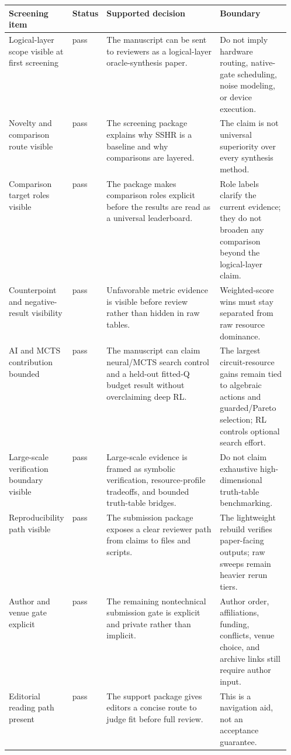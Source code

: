 \begin{tabularx}{\linewidth}{>{\raggedright\arraybackslash}p{0.20\linewidth}>{\raggedright\arraybackslash}p{0.11\linewidth}>{\raggedright\arraybackslash}X>{\raggedright\arraybackslash}p{0.25\linewidth}}
\toprule
Screening item & Status & Supported decision & Boundary \\
\midrule
Logical-layer scope visible at first screening & pass & The manuscript can be sent to reviewers as a logical-layer oracle-synthesis paper. & Do not imply hardware routing, native-gate scheduling, noise modeling, or device execution. \\
Novelty and comparison route visible & pass & The screening package explains why SSHR is a baseline and why comparisons are layered. & The claim is not universal superiority over every synthesis method. \\
Comparison target roles visible & pass & The package makes comparison roles explicit before the results are read as a universal leaderboard. & Role labels clarify the current evidence; they do not broaden any comparison beyond the logical-layer claim. \\
Counterpoint and negative-result visibility & pass & Unfavorable metric evidence is visible before review rather than hidden in raw tables. & Weighted-score wins must stay separated from raw resource dominance. \\
AI and MCTS contribution bounded & pass & The manuscript can claim neural/MCTS search control and a held-out fitted-Q budget result without overclaiming deep RL. & The largest circuit-resource gains remain tied to algebraic actions and guarded/Pareto selection; RL controls optional search effort. \\
Large-scale verification boundary visible & pass & Large-scale evidence is framed as symbolic verification, resource-profile tradeoffs, and bounded truth-table bridges. & Do not claim exhaustive high-dimensional truth-table benchmarking. \\
Reproducibility path visible & pass & The submission package exposes a clear reviewer path from claims to files and scripts. & The lightweight rebuild verifies paper-facing outputs; raw sweeps remain heavier rerun tiers. \\
Author and venue gate explicit & pass & The remaining nontechnical submission gate is explicit and private rather than implicit. & Author order, affiliations, funding, conflicts, venue choice, and archive links still require author input. \\
Editorial reading path present & pass & The support package gives editors a concise route to judge fit before full review. & This is a navigation aid, not an acceptance guarantee. \\
\bottomrule
\end{tabularx}
